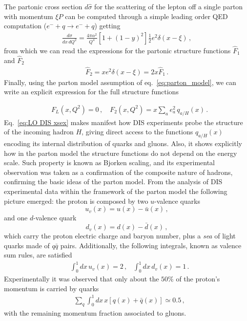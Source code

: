 %
The partonic cross section $d\hat{\sigma}$ for the scattering of the lepton off a single parton with momentum $\xi P$
can be computed through a simple leading order QED computation ($e^- + q \rightarrow e^- + q $) getting
\begin{align}
    \frac{d\hat{\sigma}}{dx\, dQ^2} = 
    \frac{4\pi \alpha^2}{Q^4}\left[1+\left(1-y\right)^2\right]\frac{1}{2} e^2\delta\left(x-\xi\right)\,,
\end{align}
from which we can read the expressions for the partonic structure functions 
$\hat{F}_1$ and $\hat{F}_2$
\begin{align}
    \hat{F}_2 = x e^2 \delta\left(x-\xi\right) = 2x \hat{F}_1\,.
\end{align}
%
Finally, using the parton model assumption of eq.~\eqref{eq:parton_model}, we can write
an explicit expression for the full structure functions

\begin{align}
    \label{eq:LO DIS xsex}
    &F_L\left(x,Q^2\right) = 0\,,\,\,\,\,\,\, 
    F_2\left(x,Q^2\right) = x\sum_a e_a^2\, q_{a/H}\left(x\right)\,. 
\end{align} 
Eq.~\eqref{eq:LO DIS xsex} makes manifest how DIS experiments probe the structure of the incoming hadron $H$,
giving direct access to the functions $q_{a/H}\left(x\right) $ encoding its internal distribution of quarks and gluons.
Also, it shows explicitly how in the parton model the structure functions do not depend on the energy scale.
Such property is known as Bjorken scaling, and its experimental observation was taken as a confirmation
of the composite nature of hadrons, confirming the basic ideas of the parton model.
From the analysis of DIS experimental data within the framework of the parton model the following picture emerged: 
the proton is composed by two $u$-valence quarks
\[
    u_v\left(x\right) = u\left(x\right) - \bar{u}\left(x\right)\,,
\]
and one $d$-valence quark
\[
    d_v\left(x\right) = d\left(x\right) - \bar{d}\left(x\right)\,,
\]
which carry the proton electric charge and baryon number, plus a \textit{sea} of light quarks made of $q\bar{q}$ pairs.
Additionally, the following integrals, known as valence sum rules, are satisfied
\begin{align}
    \label{eq:valence_sumrules_parton_model}
    &\int_0^1 dx \, u_v\left(x\right) = 2\,,\,\,\,\,\,  
    \int_0^1 dx \, d_v\left(x\right) = 1\,.
\end{align}
Experimentally it was observed that only about the $50\%$ of the proton's momentum is carried by quarks
\begin{align}    
    &\sum_q \int_0^1 dx \, x\left[q\left(x\right) + \bar{q}\left(x\right)\right] \simeq 0.5\,,
\end{align}
with the remaining momentum fraction associated to gluons.

